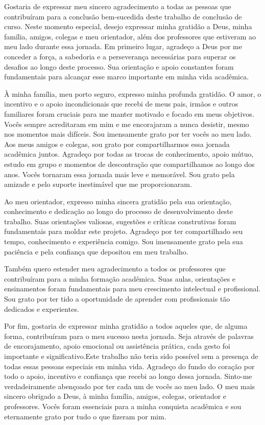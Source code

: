 \documentclass[12pt,oneside,a4paper,chapter=TITLE,
			   english,brazil]{abntex2}
\begin{document}
\begin{agradecimentos}
Gostaria de expressar meu sincero agradecimento a todas as pessoas que contribuíram para a conclusão bem-sucedida deste trabalho de conclusão de curso. Neste momento especial, desejo expressar minha gratidão a Deus, minha família, amigos, colegas e meu orientador, além dos professores que estiveram ao meu lado durante essa jornada. Em primeiro lugar, agradeço a Deus por me conceder a força, a sabedoria e a perseverança necessárias para superar os desafios ao longo deste processo. Sua orientação e apoio constantes foram fundamentais para alcançar esse marco importante em minha vida acadêmica.

À minha família, meu porto seguro, expresso minha profunda gratidão. O amor, o incentivo e o apoio incondicionais que recebi de meus pais, irmãos e outros familiares foram cruciais para me manter motivado e focado em meus objetivos. Vocês sempre acreditaram em mim e me encorajaram a nunca desistir, mesmo nos momentos mais difíceis. Sou imensamente grato por ter vocês ao meu lado. Aos meus amigos e colegas, sou grato por compartilharmos essa jornada acadêmica juntos. Agradeço por todas as trocas de conhecimento, apoio mútuo, estudo em grupo e momentos de descontração que compartilhamos ao longo dos anos. Vocês tornaram essa jornada mais leve e memorável. Sou grato pela amizade e pelo suporte inestimável que me proporcionaram.

Ao meu orientador, expresso minha sincera gratidão pela sua orientação, conhecimento e dedicação ao longo do processo de desenvolvimento deste trabalho. Suas orientações valiosas, sugestões e críticas construtivas foram fundamentais para moldar este projeto. Agradeço por ter compartilhado seu tempo, conhecimento e experiência comigo. Sou imensamente grato pela sua paciência e pela confiança que depositou em meu trabalho.

Também quero estender meu agradecimento a todos os professores que contribuíram para a minha formação acadêmica. Suas aulas, orientações e ensinamentos foram fundamentais para meu crescimento intelectual e profissional. Sou grato por ter tido a oportunidade de aprender com profissionais tão dedicados e experientes.

Por fim, gostaria de expressar minha gratidão a todos aqueles que, de alguma forma, contribuíram para o meu sucesso nesta jornada. Seja através de palavras de encorajamento, apoio emocional ou assistência prática, cada gesto foi importante e significativo.Este trabalho não teria sido possível sem a presença de todas essas pessoas especiais em minha vida. Agradeço do fundo do coração por todo o apoio, incentivo e confiança que recebi ao longo dessa jornada. Sinto-me verdadeiramente abençoado por ter cada um de vocês ao meu lado. O meu mais sincero obrigado a Deus, à minha família, amigos, colegas, orientador e professores. Vocês foram essenciais para a minha conquista acadêmica e sou eternamente grato por tudo o que fizeram por mim.
\end{agradecimentos}
\end{document}
